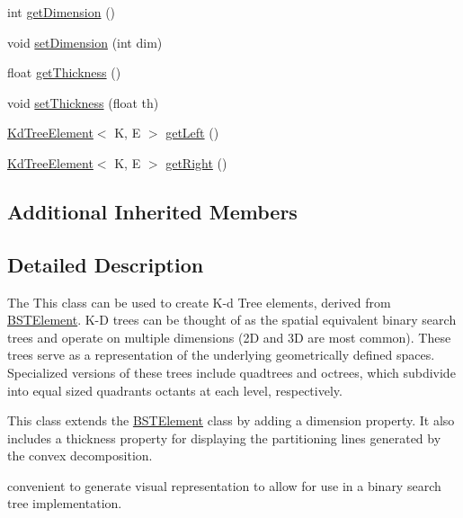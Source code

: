 \begin{DoxyCompactItemize}
\item 
int \hyperlink{classbridges_1_1base_1_1_kd_tree_element_a2469fcfe38e921ae48338ef1fd347c4a}{get\+Dimension} ()
\item 
void \hyperlink{classbridges_1_1base_1_1_kd_tree_element_af3fa89cbd20fc2c3f30784db16b6dec4}{set\+Dimension} (int dim)
\item 
float \hyperlink{classbridges_1_1base_1_1_kd_tree_element_a27c0b086af284210855ee5f1c90e7484}{get\+Thickness} ()
\item 
void \hyperlink{classbridges_1_1base_1_1_kd_tree_element_a52412fc59c743a8a0ede057ed2451be9}{set\+Thickness} (float th)
\item 
\hyperlink{classbridges_1_1base_1_1_kd_tree_element}{Kd\+Tree\+Element}$<$ K, E $>$ \hyperlink{classbridges_1_1base_1_1_kd_tree_element_a257367edc8f204c973eb277dcb5d37be}{get\+Left} ()
\item 
\hyperlink{classbridges_1_1base_1_1_kd_tree_element}{Kd\+Tree\+Element}$<$ K, E $>$ \hyperlink{classbridges_1_1base_1_1_kd_tree_element_a990694a36d44aba5f844f1752692c8e6}{get\+Right} ()
\end{DoxyCompactItemize}
\subsection*{Additional Inherited Members}


\subsection{Detailed Description}
The This class can be used to create K-\/d Tree elements, derived from \hyperlink{classbridges_1_1base_1_1_b_s_t_element}{B\+S\+T\+Element}. K-\/\+D trees can be thought of as the spatial equivalent binary search trees and operate on multiple dimensions (2\+D and 3\+D are most common). These trees serve as a representation of the underlying geometrically defined spaces. Specialized versions of these trees include quadtrees and octrees, which subdivide into equal sized quadrants octants at each level, respectively. 

This class extends the \hyperlink{classbridges_1_1base_1_1_b_s_t_element}{B\+S\+T\+Element} class by adding a dimension property. It also includes a thickness property for displaying the partitioning lines generated by the convex decomposition.

convenient to generate visual representation to allow for use in a binary search tree implementation.

